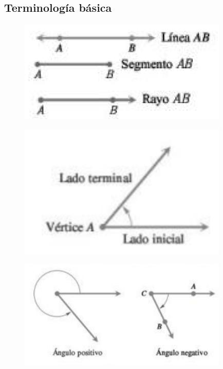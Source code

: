 \subsection{Terminología básica}
{}
	\begin{figure}
		\centering
		\includegraphics[width=10cm,keepaspectratio=true]{./trig/trig_101-1.png}
		\label{fig:101-1}
	\end{figure}
	

{}
	\begin{figure}
		\centering
		\includegraphics[width=10cm,keepaspectratio=true]{./trig/trig_101-2.png}
		\label{fig:101-2}
	\end{figure}
	

{}
	\begin{figure}
		\centering
		\includegraphics[width=10cm,keepaspectratio=true]{./trig/trig_101-3.png}
		\label{fig:101-3}
	\end{figure}
	

